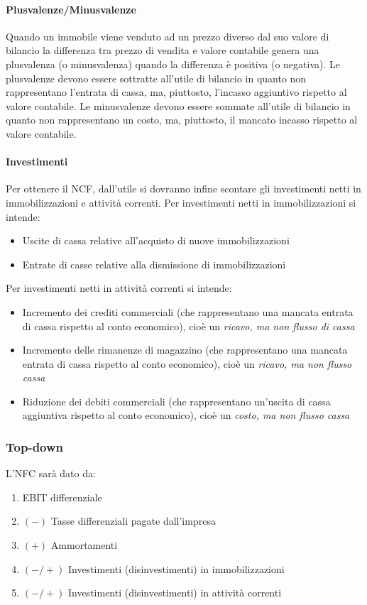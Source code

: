 \paragraph{Plusvalenze/Minusvalenze} Quando un immobile viene venduto ad un prezzo diverso dal suo valore di bilancio la differenza tra
prezzo di vendita e valore contabile genera una plusvalenza (o minusvalenza) quando la differenza è
positiva (o negativa). Le plusvalenze devono essere sottratte all’utile di bilancio in quanto non rappresentano l’entrata di cassa,
ma, piuttosto, l’incasso aggiuntivo rispetto al valore contabile. Le minusvalenze devono essere sommate all’utile di bilancio in quanto non rappresentano un costo, ma,
piuttosto, il mancato incasso rispetto al valore contabile.

\paragraph{Investimenti} Per ottenere il NCF, dall’utile si dovranno infine scontare gli investimenti netti in immobilizzazioni e
attività correnti. Per investimenti netti in immobilizzazioni si intende:
\begin{itemize}
    \item Uscite di cassa relative all’acquisto di nuove immobilizzazioni
    \item Entrate di casse relative alla dismissione di immobilizzazioni
\end{itemize}
Per investimenti netti in attività correnti si intende:
\begin{itemize}
    \item Incremento dei crediti commerciali (che rappresentano una mancata entrata di cassa rispetto al
    conto economico), cioè un \emph{ricavo, ma non flusso di cassa}
    \item Incremento delle rimanenze di magazzino (che rappresentano una mancata entrata di cassa
    rispetto al conto economico), cioè un \emph{ricavo, ma non flusso cassa}
    \item Riduzione dei debiti commerciali (che rappresentano un’uscita di cassa aggiuntiva rispetto al
    conto economico), cioè un \emph{costo, ma non flusso cassa}
\end{itemize}

\subsubsection{Top-down}
L'NFC sarà dato da:
\begin{enumerate}
    \item EBIT differenziale
    \item $(-)$ Tasse differenziali pagate dall’impresa
    \item $(+)$ Ammortamenti
    \item $(-/+)$ Investimenti (disinvestimenti) in immobilizzazioni
    \item $(-/+)$ Investimenti (disinvestimenti) in attività correnti 
\end{enumerate}


